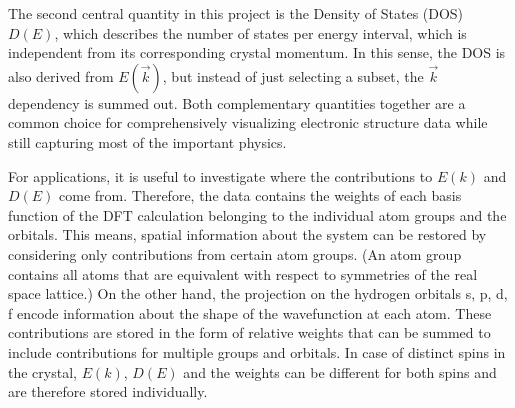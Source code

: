 The second central quantity in this project is the Density of States (DOS) $D(E)$, which describes the number of states per energy interval, which is independent from its corresponding crystal momentum. In this sense, the DOS is also derived from $E(\vec{k})$, but instead of just selecting a subset, the $\vec{k}$ dependency is summed out. Both complementary quantities together are a common choice for comprehensively visualizing electronic structure data while still capturing most of the important physics. 

For applications, it is useful to investigate where the contributions to $E(k)$ and $D(E)$ come from. Therefore, the data contains the weights of each basis function of the DFT calculation belonging to the individual atom groups and the orbitals. This means, spatial information about the system can be restored by considering only contributions from certain atom groups. (An atom group contains all atoms that are equivalent with respect to symmetries of the real space lattice.) On the other hand, the projection on the hydrogen orbitals s, p, d, f encode information about the shape of the wavefunction at each atom. These contributions are stored in the form of relative weights that can be summed to include contributions for multiple groups and orbitals. In case of distinct spins in the crystal, $E(k)$, $D(E)$ and the weights can be different for both spins and are therefore stored individually.



